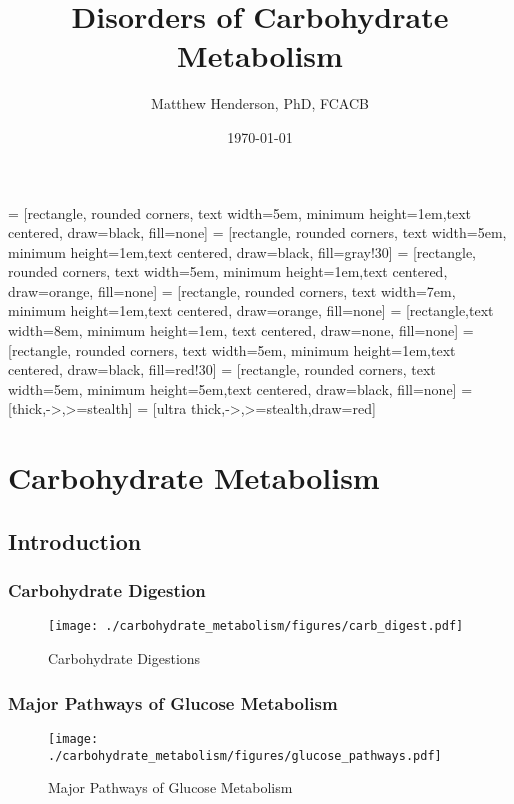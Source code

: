 \documentclass{scrartcl}
\author{Matthew Henderson, PhD, FCACB}
\date{\today}
\title{Disorders of Carbohydrate Metabolism}
\begin{document}
\maketitle
\setcounter{tocdepth}{2}
\tableofcontents


 = [rectangle, rounded corners, text width=5em, minimum height=1em,text centered, draw=black, fill=none]
 = [rectangle, rounded corners, text width=5em, minimum height=1em,text centered, draw=black, fill=gray!30]
 = [rectangle, rounded corners, text width=5em, minimum height=1em,text centered, draw=orange, fill=none]
 = [rectangle, rounded corners, text width=7em, minimum height=1em,text centered, draw=orange, fill=none]
 = [rectangle,text width=8em, minimum height=1em, text centered, draw=none, fill=none]
 = [rectangle, rounded corners, text width=5em, minimum height=1em,text centered, draw=black, fill=red!30]
 = [rectangle, rounded corners, text width=5em, minimum height=5em,text centered, draw=black, fill=none]
 = [thick,->,>=stealth]
 = [ultra thick,->,>=stealth,draw=red]


\section{Carbohydrate Metabolism}
\label{sec:orgc41340e}
\subsection{Introduction}
\label{sec:org5a24478}
\subsubsection{Carbohydrate Digestion}
\label{sec:org7ae0749}
\begin{figure}[htbp]
\centering
\texttt{[image: ./carbohydrate\_metabolism/figures/carb\_digest.pdf]}
\caption{\label{fig:orgca8fa6c}
Carbohydrate Digestions}
\end{figure}

\subsubsection{Major Pathways of Glucose Metabolism}
\label{sec:org5825259}

\begin{figure}[htbp]
\centering
\texttt{[image: ./carbohydrate\_metabolism/figures/glucose\_pathways.pdf]}
\caption{\label{fig:org011b91b}
Major Pathways of Glucose Metabolism}
\end{figure}
\end{document}

